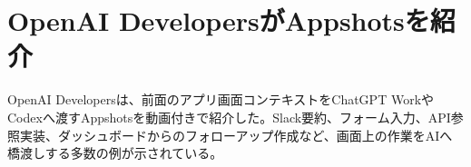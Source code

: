\section{OpenAI DevelopersがAppshotsを紹介}
OpenAI Developersは、前面のアプリ画面コンテキストをChatGPT WorkやCodexへ渡すAppshotsを動画付きで紹介した。Slack要約、フォーム入力、API参照実装、ダッシュボードからのフォローアップ作成など、画面上の作業をAIへ橋渡しする多数の例が示されている。
